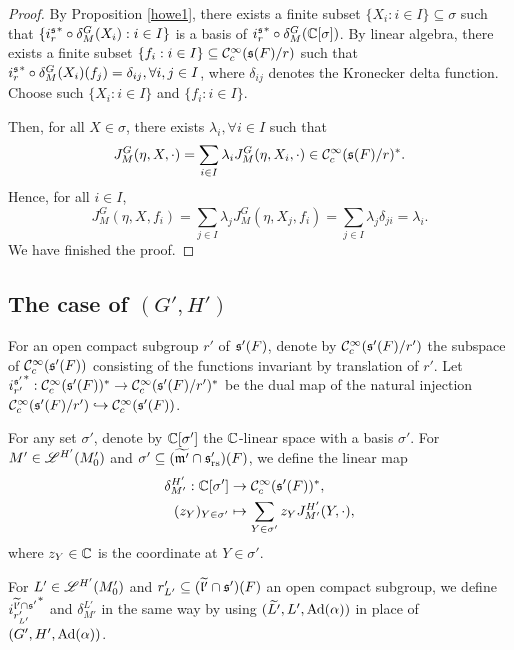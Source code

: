 \documentclass[a4paper]{amsart}
\newcommand{\fm}{{\mathfrak{m}}} \newcommand{\fn}{{\mathfrak{n}}}\newcommand{\fo}{{\mathfrak{o}}} \newcommand{\fp}{{\mathfrak{p}}}
\newcommand{\wt}{\widetilde}                        \newcommand{\wh}{\widehat}                      \newcommand{\wpair}[1]{\left\{{#1}\right\}}
\theoremstyle{definition}
\theoremstyle{remark}
\numberwithin{equation}{subsection}
\begin{document}
\begin{proof}
By Proposition \ref{howe1}, there exists  a finite subset $\{X_i: i\in I\}\subseteq\sigma$ such that $\{{i_r^{\mathfrak{s}}}^\ast\circ\delta_M^G(X_i):i\in I\}$ is a basis of ${i_r^{\mathfrak{s}}}^\ast\circ\delta_M^G({\mathbb {C}}[\sigma])$. By linear algebra, there exists a finite subset $\{f_i: i\in I\}\subseteq{\mathcal {C}}_c^\infty({\mathfrak{s}}(F)/r)$ such that ${i_r^{\mathfrak{s}}}^\ast\circ\delta_M^G(X_i)(f_j)=\delta_{ij}, \forall i,j\in I$, where $\delta_{ij}$ denotes the Kronecker delta function. Choose such $\{X_i: i\in I\}$ and $\{f_i: i\in I\}$. 

Then, for all $X\in\sigma$, there exists $\lambda_i, \forall i\in I$ such that
$$ J_M^G(\eta, X, \cdot)=\sum_{i\in I} \lambda_i J_M^G(\eta, X_i, \cdot)\in{\mathcal {C}}_c^\infty({\mathfrak{s}}(F)/r)^\ast. $$
Hence, for all $i\in I$, 
$$ J_M^G(\eta, X, f_i)=\sum_{j\in I} \lambda_j J_M^G(\eta, X_j, f_i)=\sum_{j\in I} \lambda_j\delta_{ji}=\lambda_i. $$
We have finished the proof. 
\end{proof}

\subsection{The case of $(G',H')$}

For an open compact subgroup $r'$ of ${\mathfrak{s}}'(F)$, denote by ${\mathcal {C}}_c^\infty({\mathfrak{s}}'(F)/r')$ the subspace of ${\mathcal {C}}_c^\infty({\mathfrak{s}}'(F))$ consisting of the functions invariant by translation of $r'$. Let ${i_{r'}^{{\mathfrak{s}}'}}^*: {\mathcal {C}}_c^\infty({\mathfrak{s}}'(F))^*\rightarrow{\mathcal {C}}_c^\infty({\mathfrak{s}}'(F)/r')^*$ be the dual map of the natural injection ${\mathcal {C}}_c^\infty({\mathfrak{s}}'(F)/r')\hookrightarrow{\mathcal {C}}_c^\infty({\mathfrak{s}}'(F))$. 

For any set $\sigma'$, denote by ${\mathbb {C}}[\sigma']$ the ${\mathbb {C}}$-linear space with a basis $\sigma'$. For $M'\in\mathscr{L}^{H'}(M'_0)$ and $\sigma'\subseteq (\wt{\fm'}\cap\fs'_\rs)(F)$, we define the linear map
\[\begin{split}
\delta_{M'}^{H'}: {\mathbb {C}}[\sigma'] &\rightarrow {\mathcal {C}}_c^\infty({\mathfrak{s}}'(F))^*, \\
(z_Y)_{Y\in\sigma'} &\mapsto \sum_{Y\in\sigma'} z_Y J_{M'}^{H'}(Y, \cdot), \\
\end{split}\]
where $z_Y\in{\mathbb {C}}$ is the coordinate at $Y\in\sigma'$. 

For $L'\in\mathscr{L}^{H'}(M'_0)$ and $r'_{L'}\subseteq(\wt{\fl'}\cap\fs')(F)$ an open compact subgroup, we define ${i_{r'_{L'}}^{\wt{\fl'}\cap\fs'}}^*$ and $\delta_{M'}^{L'}$ in the same way by using $(\wt{L'}, L', \Ad(\alpha))$ in place of $(G', H', {\mathrm{Ad}}(\alpha))$. 
\end{document}
